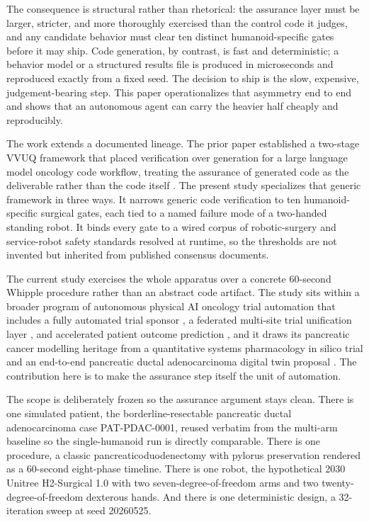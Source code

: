 The consequence is
structural rather than rhetorical: the assurance layer must be larger, stricter,
and more thoroughly exercised than the control code it judges, and any candidate
behavior must clear ten distinct humanoid-specific gates before it may ship. Code
generation, by contrast, is fast and deterministic; a behavior model or a
structured results file is produced in microseconds and reproduced exactly from a
fixed seed. The decision to ship is the slow, expensive, judgement-bearing step.
This paper operationalizes that asymmetry end to end and shows that an autonomous
agent can carry the heavier half cheaply and reproducibly.

The work extends a documented lineage. The prior paper established a two-stage
VVUQ framework that placed verification over generation for a large language
model oncology code workflow, treating the assurance of generated code as the
deliverable rather than the code itself \cite{kawchak2026vvuq01}. The present
study specializes that generic framework in three ways. It narrows generic code
verification to ten humanoid-specific surgical gates, each tied to a named
failure mode of a two-handed standing robot. It binds every gate to a wired
corpus of robotic-surgery and service-robot safety standards resolved at runtime,
so the thresholds are not invented but inherited from published consensus
documents. 

\clearpage

The current study exercises the whole apparatus over a concrete 60-second Whipple
procedure rather than an abstract code artifact. The study sits within a broader
program of autonomous physical AI oncology trial automation that includes a fully
automated trial sponsor \cite{kawchak2026sponsor}, a federated multi-site trial
unification layer \cite{kawchak2026federated}, and accelerated patient outcome
prediction \cite{kawchak2026prediction}, and it draws its pancreatic cancer
modelling heritage from a quantitative systems pharmacology in silico trial
\cite{kawchak2025qsppdac} and an end-to-end pancreatic ductal adenocarcinoma
digital twin proposal \cite{kawchak2025pdactwin}. The contribution here is to
make the assurance step itself the unit of automation.

The scope is deliberately frozen so the assurance argument stays clean. There is
one simulated patient, the borderline-resectable pancreatic ductal
adenocarcinoma case PAT-PDAC-0001, reused verbatim from the multi-arm baseline so
the single-humanoid run is directly comparable. There is one procedure, a classic
pancreaticoduodenectomy with pylorus preservation rendered as a 60-second
eight-phase timeline. There is one robot, the hypothetical 2030 Unitree
H2-Surgical 1.0 with two seven-degree-of-freedom arms and two
twenty-degree-of-freedom dexterous hands. And there is one deterministic design,
a 32-iteration sweep at seed 20260525. 

